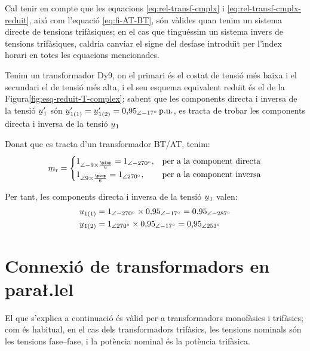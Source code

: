 Cal tenir en compte que les equacions \eqref{eq:rel-transf-cmplx} i \eqref{eq:rel-transf-cmplx-reduit}, aix\'{\i} com l'equaci\'{o} \eqref{eq:fi-AT-BT}, s\'{o}n v\`{a}lides quan tenim un sistema directe de tensions trif\`{a}siques; en el cas que tingu\'{e}ssim un sistema invers de tensions trif\`{a}siques, caldria canviar el signe del desfase introdu\"{\i}t per l'\'{\i}ndex horari en totes les equacions mencionades.


\begin{exemple}
Tenim un transformador Dy9, on el primari \'{e}s el costat de tensi\'{o} m\'{e}s baixa  i el secundari el de tensi\'{o} m\'{e}s alta, i el seu esquema equivalent redu\"{\i}t \'{e}s el de la Figura\vref{fig:esq-reduit-T-complex}; sabent que les components directa i inversa de la tensi\'{o} $\cmplx{u}'_1$ s\'{o}n
$\cmplx{u}'_{1(1)}= \cmplx{u}'_{1(2)} = 0{,}95_{\angle -17\degree}\unit{p.u.}$, es tracta de trobar les components directa i inversa de la tensi\'{o} $\cmplx{u}_1$

    Donat que es tracta d'un transformador BT/AT, tenim:
    \[
    \cmplx{m}\ped{r} = \begin{cases}
      1_{\angle -9\times\frac{\piup}{6}} = 1_{\angle -270\degree}, & \text{per a la component directa}\\
      1_{\angle 9\times\frac{\piup}{6}} = 1_{\angle 270\degree}, & \text{per a la component inversa}
    \end{cases}
    \]

     Per tant, les components directa i inversa de la tensi\'{o}  $\cmplx{u}_1$ valen:
    \begin{align*}
    \cmplx{u}_{1(1)} &= 1_{\angle -270\degree}\times 0{,}95_{\angle -17\degree}  = 0{,}95_{\angle -287\degree} \\
    \cmplx{u}_{1(2)} &= 1_{\angle  270\degree}\times 0{,}95_{\angle -17\degree}  = 0{,}95_{\angle 253\degree}
    \end{align*}
\end{exemple}



\section{\texorpdfstring{Connexi\'{o} de transformadors en para{\l.l}el}{Connexi\'{o} de transformadors en paral-lel}}

El que s'explica a continuaci\'{o} \'{e}s v\`{a}lid per a transformadors
monof\`{a}sics i trif\`{a}sics; com \'{e}s habitual, en el cas dels
transformadors trif\`{a}sics, les tensions nominals s\'{o}n les tensions
fase--fase, i la pot\`{e}ncia nominal \'{e}s la pot\`{e}ncia trif\`{a}sica.

